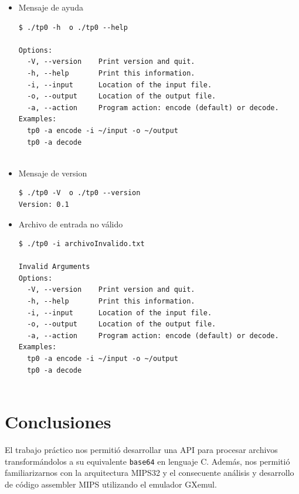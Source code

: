 \documentclass[10pt,a4paper]{article}
\begin{document}
\begin{itemize}
    \item Mensaje de ayuda\\
    
\begin{lstlisting}
$ ./tp0 -h  o ./tp0 --help

Options:
  -V, --version    Print version and quit.
  -h, --help       Print this information.
  -i, --input      Location of the input file.
  -o, --output     Location of the output file.
  -a, --action     Program action: encode (default) or decode.
Examples:
  tp0 -a encode -i ~/input -o ~/output
  tp0 -a decode


\end{lstlisting}     
     
	\item Mensaje de version\\

            \begin{lstlisting}
$ ./tp0 -V  o ./tp0 --version
Version: 0.1
             \end{lstlisting}  
         
         
    \item Archivo de entrada no válido
            \begin{lstlisting}
$ ./tp0 -i archivoInvalido.txt

Invalid Arguments
Options:
  -V, --version    Print version and quit.
  -h, --help       Print this information.
  -i, --input      Location of the input file.
  -o, --output     Location of the output file.
  -a, --action     Program action: encode (default) or decode.
Examples:
  tp0 -a encode -i ~/input -o ~/output
  tp0 -a decode


             \end{lstlisting}  

\end{itemize}


\newpage

\section{Conclusiones}

El trabajo práctico nos permitió desarrollar una API para procesar archivos transformándolos a su equivalente \texttt{base64} en lenguaje C. Además, nos permitió familiarizarnos con la arquitectura MIPS32 y el consecuente análisis y desarrollo de código assembler MIPS utilizando el emulador GXemul.
\end{document}

